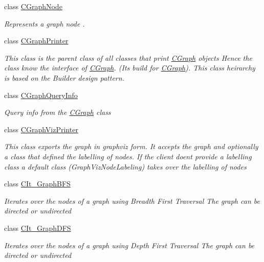 \begin{DoxyCompactItemize}
class \hyperlink{class_graph_library_1_1_c_graph_node}{C\+Graph\+Node}
\begin{DoxyCompactList}\small\item\em Represents a graph node . \end{DoxyCompactList}\item 
class \hyperlink{class_graph_library_1_1_c_graph_printer}{C\+Graph\+Printer}
\begin{DoxyCompactList}\small\item\em This class is the parent class of all classes that print \hyperlink{class_graph_library_1_1_c_graph}{C\+Graph} objects Hence the class know the interface of \hyperlink{class_graph_library_1_1_c_graph}{C\+Graph}. (Its build for \hyperlink{class_graph_library_1_1_c_graph}{C\+Graph}). This class heirarchy is based on the Builder design pattern. \end{DoxyCompactList}\item 
class \hyperlink{class_graph_library_1_1_c_graph_query_info}{C\+Graph\+Query\+Info}
\begin{DoxyCompactList}\small\item\em Query info from the \hyperlink{class_graph_library_1_1_c_graph}{C\+Graph} class \end{DoxyCompactList}\item 
class \hyperlink{class_graph_library_1_1_c_graph_viz_printer}{C\+Graph\+Viz\+Printer}
\begin{DoxyCompactList}\small\item\em This class exports the graph in graphviz form. It accepts the graph and optionally a class that defined the labelling of nodes. If the client doen\textquotesingle{}t provide a labelling class a default class (Graph\+Viz\+Node\+Labeling) takes over the labelling of nodes \end{DoxyCompactList}\item 
class \hyperlink{class_graph_library_1_1_c_it___graph_b_f_s}{C\+It\+\_\+\+Graph\+B\+F\+S}
\begin{DoxyCompactList}\small\item\em Iterates over the nodes of a graph using Breadth First Traversal The graph can be directed or undirected \end{DoxyCompactList}\item 
class \hyperlink{class_graph_library_1_1_c_it___graph_d_f_s}{C\+It\+\_\+\+Graph\+D\+F\+S}
\begin{DoxyCompactList}\small\item\em Iterates over the nodes of a graph using Depth First Traversal The graph can be directed or undirected \end{DoxyCompactList}\item 

\end{DoxyCompactItemize}
